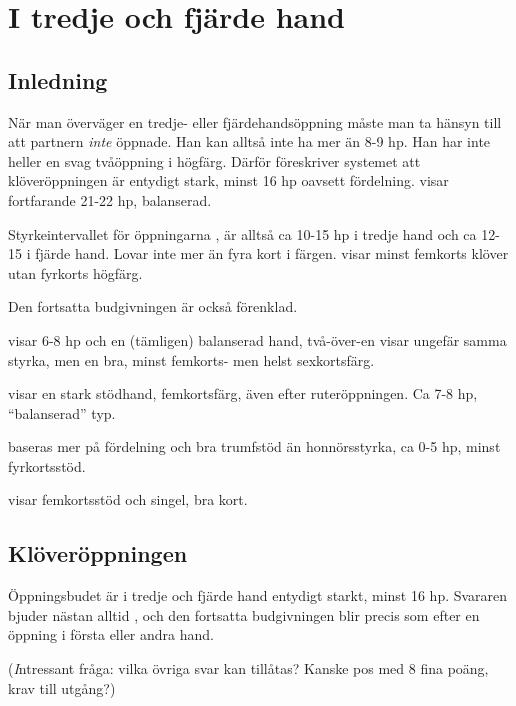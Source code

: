 \chapter{I tredje och fjärde hand}

\section{Inledning}

När man överväger en tredje- eller fjärdehandsöppning måste man ta
hänsyn till att partnern {\em inte} öppnade. Han kan alltså inte ha
mer än 8-9 hp. Han har inte heller
en svag tvåöppning i högfärg. Därför föreskriver 
systemet att klöveröppningen är entydigt stark, minst 16 hp oavsett
fördelning.  visar fortfarande 21-22 hp, balanserad.

Styrkeintervallet för öppningarna ,  är alltså
ca 10-15 hp i tredje hand och ca 12-15 i fjärde hand. Lovar inte mer än
fyra kort i färgen.  visar minst femkorts klöver utan fyrkorts högfärg.  

Den fortsatta budgivningen är också förenklad.

\bbe

\item[- \NT{1}] visar 6-8 hp och en (tämligen) balanserad
hand, två-över-en visar ungefär samma styrka, men en bra, minst
femkorts- men helst sexkortsfärg.

\item[- \NT{2}] visar en stark stödhand, femkortsfärg, även efter
ruteröppningen. Ca 7-8 hp, ``balanserad'' typ.

\item[- Dubbelhöjningen] baseras mer på fördelning och bra trumfstöd än
hon\-nörs\-styr\-ka, ca 0-5 hp, minst fyrkortsstöd. 

\item[- Hopp i ny] visar femkortsstöd och singel, bra kort.
\ebe

\section{Klöveröppningen}

Öppningsbudet  är i tredje och fjärde hand entydigt starkt, minst 16
hp. Svararen bjuder nästan alltid , och den fortsatta budgivningen
blir precis som efter en öppning i första eller andra hand. 

(\emph Intressant fråga: vilka övriga svar kan tillåtas? Kanske pos med 8
fina poäng, krav till utgång?)

